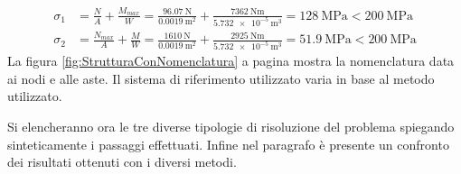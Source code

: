 \begin{align*}
    \sigma_1 &= \frac{N}{A} + \frac{M_{max}}{W} = \frac{\SI{96.07}{\newton}}{\SI{0.0019}{\metre\squared}} + \frac{\SI{7362}{\newton\metre}}{\SI{5.732e-5}{\metre\cubed}} = \SI{128}{\mega\pascal}< \SI{200}{\mega\pascal}\\
    \sigma_2 &= \frac{N_{max}}{A} + \frac{M}{W} = \frac{\SI{1610}{\newton}}{\SI{0.0019}{\metre\squared}} + \frac{\SI{2925}{\newton\metre}}{\SI{5.732e-5}{\metre\cubed}} =\SI{51.9}{\mega\pascal} < \SI{200}{\mega\pascal}
\end{align*}
La figura \ref{fig:StrutturaConNomenclatura} a pagina \pageref{fig:StrutturaConNomenclatura} mostra la nomenclatura data ai nodi e alle aste. Il sistema di riferimento utilizzato varia in base al metodo utilizzato.

Si elencheranno ora le tre diverse tipologie di risoluzione del problema spiegando sinteticamente i passaggi effettuati. 
Infine nel paragrafo \label{cap:cap4} è presente un confronto dei risultati ottenuti con i diversi metodi.

	
    
    
\pagebreak

